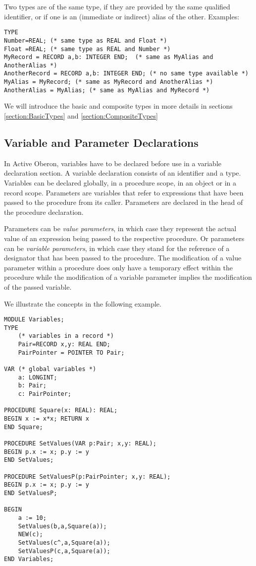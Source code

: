 \documentclass[a4paper,11pt]{article}
\begin{document}
Two types are of the same type, if they are provided by the same qualified identifier, or if one is an (immediate or indirect) alias of the other. Examples:
\begin{lstlisting}[language=Oberon,frame=none,caption={Same and different types}]
TYPE
Number=REAL; (* same type as REAL and Float *)
Float =REAL; (* same type as REAL and Number *)
MyRecord = RECORD a,b: INTEGER END;  (* same as MyAlias and AnotherAlias *)
AnotherRecord = RECORD a,b: INTEGER END; (* no same type available *)
MyAlias = MyRecord; (* same as MyRecord and AnotherAlias *)
AnotherAlias = MyAlias; (* same as MyAlias and MyRecord *)
\end{lstlisting}

We will introduce the basic and composite types in more details in sections \ref{section:BasicTypes} and \ref{section:CompositeTypes}

\subsection{Variable and Parameter Declarations}
In Active Oberon, variables have to be declared before use in a variable declaration section. A variable declaration consists of an identifier and a type. Variables can be declared globally, in a procedure scope, in an object or in a record scope. Parameters are variables that refer to expressions that have been passed to the procedure from its caller. Parameters are declared in the head of the procedure declaration.

Parameters can be {\em value parameters}, in which case they represent the actual value of an expression being passed to the respective procedure. Or parameters can be {\em variable parameters}, in which case they stand for the reference of a designator that has been passed to the procedure. The modification of a value parameter within a procedure does only have a temporary effect within the procedure while the modification of a variable parameter implies the modification of the passed variable.

We illustrate the concepts in the following example.

\begin{lstlisting}[language=Oberon,frame=none,caption={Variables and Parameters}]
MODULE Variables;
TYPE
    (* variables in a record *)
    Pair=RECORD x,y: REAL END;
    PairPointer = POINTER TO Pair;

VAR (* global variables *)
    a: LONGINT;
    b: Pair;
    c: PairPointer;

PROCEDURE Square(x: REAL): REAL;
BEGIN x := x*x; RETURN x
END Square;

PROCEDURE SetValues(VAR p:Pair; x,y: REAL);
BEGIN p.x := x; p.y := y
END SetValues;

PROCEDURE SetValuesP(p:PairPointer; x,y: REAL);
BEGIN p.x := x; p.y := y
END SetValuesP;

BEGIN
    a := 10;
    SetValues(b,a,Square(a));
    NEW(c);
    SetValues(c^,a,Square(a));
    SetValuesP(c,a,Square(a));
END Variables;
\end{lstlisting}
\end{document}
